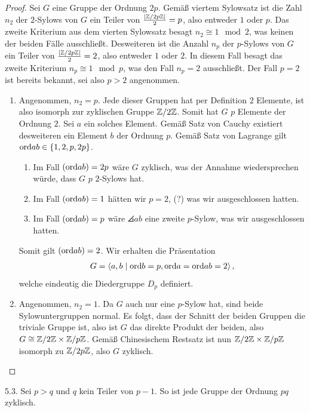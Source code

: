 \documentclass{article}
\newcommand{\ex}[1]{\tit{Übung} #1.}
\begin{document}
		\begin{proof}
			Sei $G$ eine Gruppe der Ordnung $2p$. Gemäß viertem Sylowsatz ist die Zahl $n_2$ der $2$-Sylows von $G$ ein Teiler von $\frac{\abs{\mathbb{Z}/2p\mathbb{Z}}}{2} = p$, also entweder $1$ oder $p$. Das zweite Kriterium aus dem vierten Sylowsatz besagt $n_2 \cong 1 \mod 2$, was keinen der beiden Fälle ausschließt.
			\newpar
			Desweiteren ist die Anzahl $n_p$ der $p$-Sylows von $G$ ein Teiler von $\frac{\abs{\mathbb{Z}/2p\mathbb{Z}}}{2} = 2$, also entweder $1$ oder $2$. In diesem Fall besagt das zweite Kriterium $n_p \cong 1 \mod p$, was den Fall $n_p = 2$ ausschließt.
			\newpar
			Der Fall $p = 2$ ist bereits bekannt, sei also $p > 2$ angenommen.
			\begin{enumerate}
				\item Angenommen, $n_2 = p$. Jede dieser Gruppen hat per Definition $2$ Elemente, ist also isomorph zur zyklischen Gruppe $\mathbb{Z}/2\mathbb{Z}$. Somit hat $G$ $p$ Elemente der Ordnung $2$. Sei $a$ ein solches Element. Gemäß Satz von Cauchy existiert desweiteren ein Element $b$ der Ordnung $p$.
				\newpar
				Gemäß Satz von Lagrange gilt $\textnormal{ord} ab \in \qty{1,2,p,2p}$.
				\begin{enumerate}
					\item Im Fall $(\textnormal{ord} ab) = 2p$ wäre $G$ zyklisch, was der Annahme wiedersprechen würde, dass $G$ $p$ $2$-Sylows hat.
					\item Im Fall $(\textnormal{ord} ab) = 1$ hätten wir $p = 2$, (?) was wir ausgeschlossen hatten. 
					\item Im Fall $(\textnormal{ord} ab) = p$ wäre $\angles{ab}$ eine zweite $p$-Sylow, was wir ausgeschlossen hatten.
				\end{enumerate} 
				Somit gilt $(\textnormal{ord} ab) = 2$. Wir erhalten die Präsentation
				\begin{align*}
					G = \left\langle a,b \mid \textnormal{ord} b = p, \textnormal{ord} a = \textnormal{ord} ab = 2 \right\rangle,
				\end{align*}
				welche eindeutig die Diedergruppe $D_p$ definiert.
				\item Angenommen, $n_2 = 1$. Da $G$ auch nur eine $p$-Sylow hat, sind beide Sylowuntergruppen normal. Es folgt, dass der Schnitt der beiden Gruppen die triviale Gruppe ist, also ist $G$ das direkte Produkt der beiden, also $G \cong \mathbb{Z}/2\mathbb{Z} \times \mathbb{Z}/p\mathbb{Z}$. Gemäß Chinesischem Restsatz ist nun $\mathbb{Z}/2\mathbb{Z} \times \mathbb{Z}/p\mathbb{Z}$ isomorph zu $\mathbb{Z}/2p\mathbb{Z}$, also $G$ zyklisch.
			\end{enumerate}
		\end{proof}
		\newpar
		\ex{5.3} Sei $p > q$ und $q$ kein Teiler von $p-1$. So ist jede Gruppe der Ordnung $pq$ zyklisch.
\end{document}
